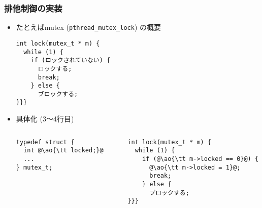 \documentclass[12pt,dvipdfmx]{beamer}
\begin{document}
\begin{frame}[fragile]
  \frametitle{排他制御の実装}
  \begin{itemize}
  \item たとえばmutex ({\tt pthread\_mutex\_lock}) の概要
\begin{lstlisting}
int lock(mutex_t * m) {
  while (1) {
    if (ロックされていない) {
      ロックする;
      break;
    } else {
      ブロックする;
}}}
\end{lstlisting}
\item 具体化 (3〜4行目)
  \begin{columns}
    \begin{column}{0.45\textwidth}
\begin{lstlisting}
typedef struct {
  int @\ao{\tt locked;}@
  ...
} mutex_t;
\end{lstlisting}
    \end{column}
    \begin{column}{0.0\textwidth}
    \end{column}
    \begin{column}{0.45\textwidth}
\begin{lstlisting}
int lock(mutex_t * m) {
  while (1) {   
    if (@\ao{\tt m->locked == 0}@) {
      @\ao{\tt m->locked = 1}@;
      break;
    } else {
      ブロックする;
}}}
\end{lstlisting}
    \end{column}
  \end{columns}
  \end{itemize}
\end{frame}
\end{document}
